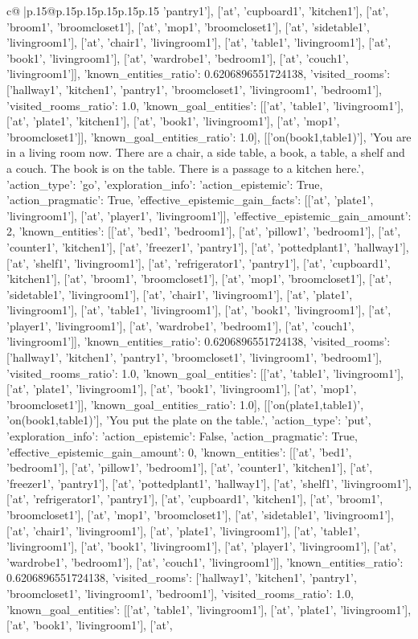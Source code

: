 \documentclass{article}
\begin{document}
{\begin{supertabular}{c@{$\;$}|p{.15\linewidth}@{}p{.15\linewidth}p{.15\linewidth}p{.15\linewidth}p{.15\linewidth}p{.15\linewidth}}
{{{'pantry1'], ['at', 'cupboard1', 'kitchen1'], ['at', 'broom1', 'broomcloset1'], ['at', 'mop1', 'broomcloset1'], ['at', 'sidetable1', 'livingroom1'], ['at', 'chair1', 'livingroom1'], ['at', 'table1', 'livingroom1'], ['at', 'book1', 'livingroom1'], ['at', 'wardrobe1', 'bedroom1'], ['at', 'couch1', 'livingroom1']], 'known_entities_ratio': 0.6206896551724138, 'visited_rooms': ['hallway1', 'kitchen1', 'pantry1', 'broomcloset1', 'livingroom1', 'bedroom1'], 'visited_rooms_ratio': 1.0, 'known_goal_entities': [['at', 'table1', 'livingroom1'], ['at', 'plate1', 'kitchen1'], ['at', 'book1', 'livingroom1'], ['at', 'mop1', 'broomcloset1']], 'known_goal_entities_ratio': 1.0}}], [['on(book1,table1)'], 'You are in a living room now. There are a chair, a side table, a book, a table, a shelf and a couch. The book is on the table. There is a passage to a kitchen here.', {'action_type': 'go', 'exploration_info': {'action_epistemic': True, 'action_pragmatic': True, 'effective_epistemic_gain_facts': [['at', 'plate1', 'livingroom1'], ['at', 'player1', 'livingroom1']], 'effective_epistemic_gain_amount': 2, 'known_entities': [['at', 'bed1', 'bedroom1'], ['at', 'pillow1', 'bedroom1'], ['at', 'counter1', 'kitchen1'], ['at', 'freezer1', 'pantry1'], ['at', 'pottedplant1', 'hallway1'], ['at', 'shelf1', 'livingroom1'], ['at', 'refrigerator1', 'pantry1'], ['at', 'cupboard1', 'kitchen1'], ['at', 'broom1', 'broomcloset1'], ['at', 'mop1', 'broomcloset1'], ['at', 'sidetable1', 'livingroom1'], ['at', 'chair1', 'livingroom1'], ['at', 'plate1', 'livingroom1'], ['at', 'table1', 'livingroom1'], ['at', 'book1', 'livingroom1'], ['at', 'player1', 'livingroom1'], ['at', 'wardrobe1', 'bedroom1'], ['at', 'couch1', 'livingroom1']], 'known_entities_ratio': 0.6206896551724138, 'visited_rooms': ['hallway1', 'kitchen1', 'pantry1', 'broomcloset1', 'livingroom1', 'bedroom1'], 'visited_rooms_ratio': 1.0, 'known_goal_entities': [['at', 'table1', 'livingroom1'], ['at', 'plate1', 'livingroom1'], ['at', 'book1', 'livingroom1'], ['at', 'mop1', 'broomcloset1']], 'known_goal_entities_ratio': 1.0}}], [['on(plate1,table1)', 'on(book1,table1)'], 'You put the plate on the table.', {'action_type': 'put', 'exploration_info': {'action_epistemic': False, 'action_pragmatic': True, 'effective_epistemic_gain_amount': 0, 'known_entities': [['at', 'bed1', 'bedroom1'], ['at', 'pillow1', 'bedroom1'], ['at', 'counter1', 'kitchen1'], ['at', 'freezer1', 'pantry1'], ['at', 'pottedplant1', 'hallway1'], ['at', 'shelf1', 'livingroom1'], ['at', 'refrigerator1', 'pantry1'], ['at', 'cupboard1', 'kitchen1'], ['at', 'broom1', 'broomcloset1'], ['at', 'mop1', 'broomcloset1'], ['at', 'sidetable1', 'livingroom1'], ['at', 'chair1', 'livingroom1'], ['at', 'plate1', 'livingroom1'], ['at', 'table1', 'livingroom1'], ['at', 'book1', 'livingroom1'], ['at', 'player1', 'livingroom1'], ['at', 'wardrobe1', 'bedroom1'], ['at', 'couch1', 'livingroom1']], 'known_entities_ratio': 0.6206896551724138, 'visited_rooms': ['hallway1', 'kitchen1', 'pantry1', 'broomcloset1', 'livingroom1', 'bedroom1'], 'visited_rooms_ratio': 1.0, 'known_goal_entities': [['at', 'table1', 'livingroom1'], ['at', 'plate1', 'livingroom1'], ['at', 'book1', 'livingroom1'], ['at', }}}
\end{supertabular}}
\end{document}

